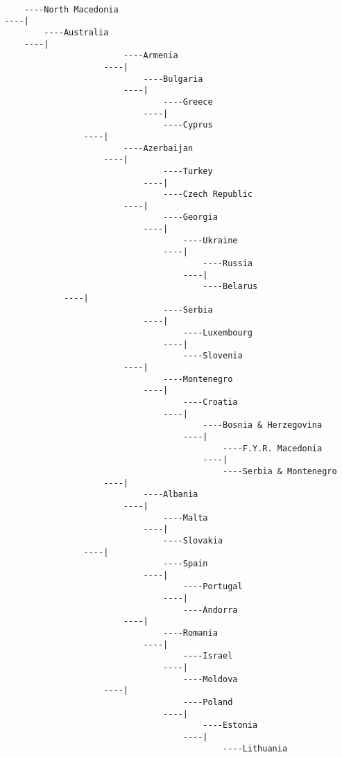 \documentclass[a4paper,11pt]{article}
\begin{document}
\begin{lstlisting}

    ----North Macedonia
----|
        ----Australia
    ----|
                        ----Armenia
                    ----|
                            ----Bulgaria
                        ----|
                                ----Greece
                            ----|
                                ----Cyprus
                ----|
                        ----Azerbaijan
                    ----|
                                ----Turkey
                            ----|
                                ----Czech Republic
                        ----|
                                ----Georgia
                            ----|
                                    ----Ukraine
                                ----|
                                        ----Russia
                                    ----|
                                        ----Belarus
            ----|
                                ----Serbia
                            ----|
                                    ----Luxembourg
                                ----|
                                    ----Slovenia
                        ----|
                                ----Montenegro
                            ----|
                                    ----Croatia
                                ----|
                                        ----Bosnia & Herzegovina
                                    ----|
                                            ----F.Y.R. Macedonia
                                        ----|
                                            ----Serbia & Montenegro
                    ----|
                            ----Albania
                        ----|
                                ----Malta
                            ----|
                                ----Slovakia
                ----|
                                ----Spain
                            ----|
                                    ----Portugal
                                ----|
                                    ----Andorra
                        ----|
                                ----Romania
                            ----|
                                    ----Israel
                                ----|
                                    ----Moldova
                    ----|
                                    ----Poland
                                ----|
                                        ----Estonia
                                    ----|
                                            ----Lithuania

\end{lstlisting}
\end{document}
